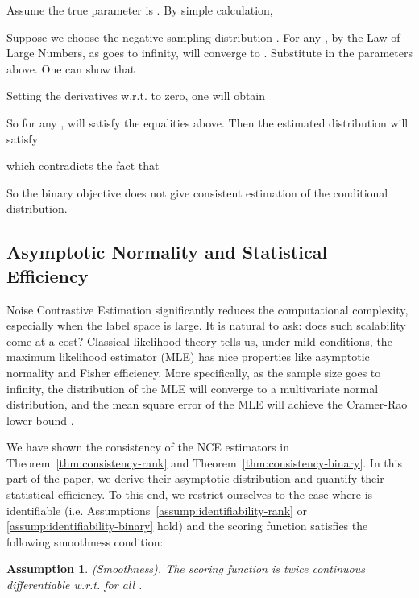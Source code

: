 \documentclass[11pt,a4paper]{article}
\newtheorem{assumption}{Assumption}[section]
\begin{document}
\vspace{-0.7cm}

Assume the true parameter is . By simple calculation, 

\vspace{-0.7cm}

\vspace{-0.7cm}

Suppose we choose the negative sampling distribution . For any , by the Law of Large Numbers, as  goes to infinity,  will converge to . Substitute in the parameters above. One can show that

Setting the derivatives w.r.t.  to zero, one will obtain 

So for any ,  will satisfy the equalities above. 
Then the estimated distribution  will satisfy

which contradicts the fact that 

So the binary objective does not give consistent estimation of the conditional distribution. 



\subsection{Asymptotic Normality and Statistical Efficiency}
\label{sec:stat-efficiency}
Noise Contrastive Estimation significantly reduces the computational
complexity, especially when the label space  is
large. It is natural to ask: does such scalability come at a cost?
Classical likelihood theory tells us, under mild conditions, the
maximum likelihood estimator (MLE) has nice properties like
asymptotic normality and Fisher efficiency. More specifically, as the sample
size goes to infinity, the distribution of the MLE will converge to a
multivariate normal distribution, and the mean square error of the MLE
will achieve the Cramer-Rao lower bound \citep{ferguson1996course}.

We have shown the consistency of the NCE estimators in Theorem~\ref{thm:consistency-rank} and
Theorem~\ref{thm:consistency-binary}. In this part of the paper, we derive their
asymptotic distribution and quantify their statistical efficiency. To
this end, we restrict ourselves to the case where  is identifiable (i.e. Assumptions~\ref{assump:identifiability-rank} or
\ref{assump:identifiability-binary} hold) and the scoring function  satisfies the following smoothness condition:
\begin{assumption}
  (Smoothness). The scoring function  is twice continuous differentiable w.r.t.  for all . 
  \label{assump:smoothness}
\end{assumption}
\end{document}
